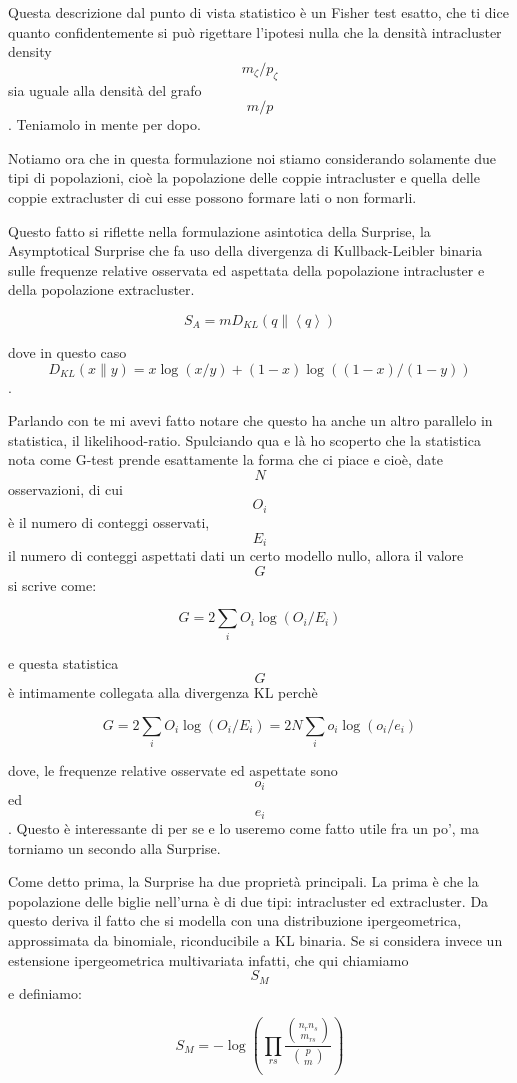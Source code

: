 Questa descrizione dal punto di vista statistico è un Fisher test
esatto, che ti dice quanto confidentemente si può rigettare l'ipotesi
nulla che la densità intracluster density \[m_\zeta/p_\zeta\] sia uguale
alla densità del grafo \[m/p\]. Teniamolo in mente per dopo.

Notiamo ora che in questa formulazione noi stiamo considerando solamente
due tipi di popolazioni, cioè la popolazione delle coppie intracluster e
quella delle coppie extracluster di cui esse possono formare lati o non
formarli.

Questo fatto si riflette nella formulazione asintotica della Surprise,
la Asymptotical Surprise che fa uso della divergenza di Kullback-Leibler
binaria sulle frequenze relative osservata ed aspettata della
popolazione intracluster e della popolazione extracluster.

\[
S_A = m D_{KL}(q \| \left< q\right>) 
\]

dove in questo caso
\[D_{KL}(x \| y)=x \log(x/y) + (1-x) \log( (1-x)/(1-y) )\].

Parlando con te mi avevi fatto notare che questo ha anche un altro
parallelo in statistica, il likelihood-ratio. Spulciando qua e là ho
scoperto che la statistica nota come G-test prende esattamente la forma
che ci piace e cioè, date \[N\] osservazioni, di cui \[O_i\] è il numero
di conteggi osservati, \[E_i\] il numero di conteggi aspettati dati un
certo modello nullo, allora il valore \[G\] si scrive come:

\[
G=2 \sum_i O_i \log(O_i/E_i)
\]

e questa statistica \[G\] è intimamente collegata alla divergenza KL
perchè

\[G=2 \sum_i O_i \log(O_i/E_i) = 2N \sum_i o_i \log(o_i/e_i)\]

dove, le frequenze relative osservate ed aspettate sono \[o_i\] ed
\[e_i\]. Questo è interessante di per se e lo useremo come fatto utile
fra un po', ma torniamo un secondo alla Surprise.

Come detto prima, la Surprise ha due proprietà principali. La prima è
che la popolazione delle biglie nell'urna è di due tipi: intracluster ed
extracluster. Da questo deriva il fatto che si modella con una
distribuzione ipergeometrica, approssimata da binomiale, riconducibile a
KL binaria. Se si considera invece un estensione ipergeometrica
multivariata infatti, che qui chiamiamo \[S_M\] e definiamo:

\[
S_{M} = -\log \left( \prod_{rs} \frac{\binom{n_r n_s}{m_{rs}} } {\binom{p}{m}} \right)
\]

